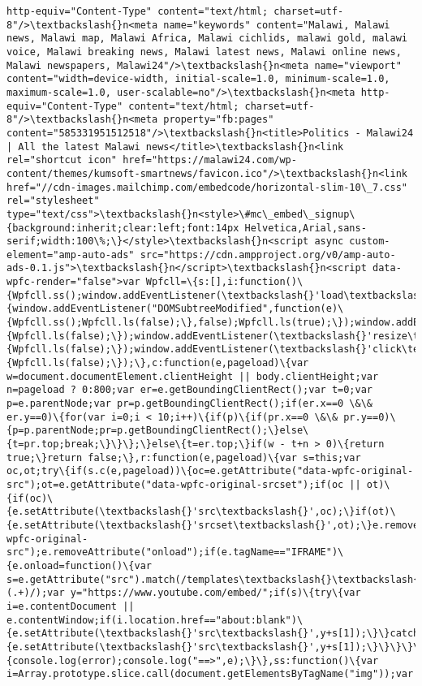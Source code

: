 \documentclass[11pt]{article}
\begin{document}
\begin{Verbatim}[commandchars=\\\{\}]
http-equiv="Content-Type" content="text/html; charset=utf-8"/>\textbackslash{}n<meta name="keywords" content="Malawi, Malawi news, Malawi map, Malawi Africa, Malawi cichlids, malawi gold, malawi voice, Malawi breaking news, Malawi latest news, Malawi online news, Malawi newspapers, Malawi24"/>\textbackslash{}n<meta name="viewport" content="width=device-width, initial-scale=1.0, minimum-scale=1.0, maximum-scale=1.0, user-scalable=no"/>\textbackslash{}n<meta http-equiv="Content-Type" content="text/html; charset=utf-8"/>\textbackslash{}n<meta property="fb:pages" content="585331951512518"/>\textbackslash{}n<title>Politics - Malawi24 | All the latest Malawi news</title>\textbackslash{}n<link rel="shortcut icon" href="https://malawi24.com/wp-content/themes/kumsoft-smartnews/favicon.ico"/>\textbackslash{}n<link href="//cdn-images.mailchimp.com/embedcode/horizontal-slim-10\_7.css" rel="stylesheet" type="text/css">\textbackslash{}n<style>\#mc\_embed\_signup\{background:inherit;clear:left;font:14px Helvetica,Arial,sans-serif;width:100\%;\}</style>\textbackslash{}n<script async custom-element="amp-auto-ads" src="https://cdn.ampproject.org/v0/amp-auto-ads-0.1.js">\textbackslash{}n</script>\textbackslash{}n<script data-wpfc-render="false">var Wpfcll=\{s:[],i:function()\{Wpfcll.ss();window.addEventListener(\textbackslash{}'load\textbackslash{}',function()\{window.addEventListener("DOMSubtreeModified",function(e)\{Wpfcll.ss();Wpfcll.ls(false);\},false);Wpfcll.ls(true);\});window.addEventListener(\textbackslash{}'scroll\textbackslash{}',function()\{Wpfcll.ls(false);\});window.addEventListener(\textbackslash{}'resize\textbackslash{}',function()\{Wpfcll.ls(false);\});window.addEventListener(\textbackslash{}'click\textbackslash{}',function()\{Wpfcll.ls(false);\});\},c:function(e,pageload)\{var w=document.documentElement.clientHeight || body.clientHeight;var n=pageload ? 0:800;var er=e.getBoundingClientRect();var t=0;var p=e.parentNode;var pr=p.getBoundingClientRect();if(er.x==0 \&\& er.y==0)\{for(var i=0;i < 10;i++)\{if(p)\{if(pr.x==0 \&\& pr.y==0)\{p=p.parentNode;pr=p.getBoundingClientRect();\}else\{t=pr.top;break;\}\}\};\}else\{t=er.top;\}if(w - t+n > 0)\{return true;\}return false;\},r:function(e,pageload)\{var s=this;var oc,ot;try\{if(s.c(e,pageload))\{oc=e.getAttribute("data-wpfc-original-src");ot=e.getAttribute("data-wpfc-original-srcset");if(oc || ot)\{if(oc)\{e.setAttribute(\textbackslash{}'src\textbackslash{}',oc);\}if(ot)\{e.setAttribute(\textbackslash{}'srcset\textbackslash{}',ot);\}e.removeAttribute("data-wpfc-original-src");e.removeAttribute("onload");if(e.tagName=="IFRAME")\{e.onload=function()\{var s=e.getAttribute("src").match(/templates\textbackslash{}\textbackslash{}/youtube\textbackslash{}\textbackslash{}.html\textbackslash{}\textbackslash{}\#(.+)/);var y="https://www.youtube.com/embed/";if(s)\{try\{var i=e.contentDocument || e.contentWindow;if(i.location.href=="about:blank")\{e.setAttribute(\textbackslash{}'src\textbackslash{}',y+s[1]);\}\}catch(err)\{e.setAttribute(\textbackslash{}'src\textbackslash{}',y+s[1]);\}\}\}\}\}\}\}catch(error)\{console.log(error);console.log("==>",e);\}\},ss:function()\{var i=Array.prototype.slice.call(document.getElementsByTagName("img"));var 
\end{Verbatim}
\end{document}
